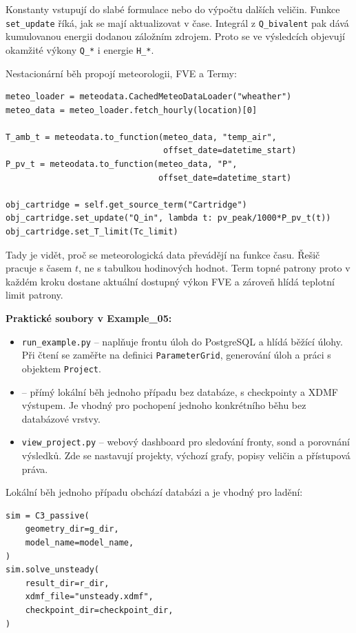 \documentclass[a4paper,11pt]{article}
\begin{document}
Konstanty vstupují do slabé formulace nebo do výpočtu dalších veličin. Funkce
\texttt{set\_update} říká, jak se mají aktualizovat v čase. Integrál z
\texttt{Q\_bivalent} pak dává kumulovanou energii dodanou záložním zdrojem. Proto
se ve výsledcích objevují okamžité výkony \texttt{Q\_*} i energie \texttt{H\_*}.

Nestacionární běh propojí meteorologii, FVE a Termy:

\begin{lstlisting}[style=py]
meteo_loader = meteodata.CachedMeteoDataLoader("wheather")
meteo_data = meteo_loader.fetch_hourly(location)[0]

T_amb_t = meteodata.to_function(meteo_data, "temp_air",
                                offset_date=datetime_start)
P_pv_t = meteodata.to_function(meteo_data, "P",
                               offset_date=datetime_start)

obj_cartridge = self.get_source_term("Cartridge")
obj_cartridge.set_update("Q_in", lambda t: pv_peak/1000*P_pv_t(t))
obj_cartridge.set_T_limit(Tc_limit)
\end{lstlisting}

Tady je vidět, proč se meteorologická data převádějí na funkce času. Řešič
pracuje s časem \(t\), ne s tabulkou hodinových hodnot. Term topné patrony proto
v každém kroku dostane aktuální dostupný výkon FVE a zároveň hlídá teplotní limit
patrony.

\textbf{Praktické soubory v Example\_05:}

\begin{itemize}
  \item \texttt{run\_example.py} -- naplňuje frontu úloh do PostgreSQL a hlídá
        běžící úlohy. Při čtení se zaměřte na definici \texttt{ParameterGrid},
        generování úloh a práci s objektem \texttt{Project}.
  \item {} -- přímý lokální běh jednoho případu bez
        databáze, s checkpointy a XDMF výstupem. Je vhodný pro pochopení jednoho
        konkrétního běhu bez databázové vrstvy.
  \item \texttt{view\_project.py} -- webový dashboard pro sledování fronty,
        sond a porovnání výsledků. Zde se nastavují projekty, výchozí grafy,
        popisy veličin a přístupová práva.
\end{itemize}

Lokální běh jednoho případu obchází databázi a je vhodný pro ladění:

\begin{lstlisting}[style=py]
sim = C3_passive(
    geometry_dir=g_dir,
    model_name=model_name,
)
sim.solve_unsteady(
    result_dir=r_dir,
    xdmf_file="unsteady.xdmf",
    checkpoint_dir=checkpoint_dir,
)
\end{lstlisting}
\end{document}
